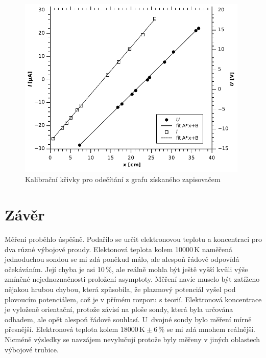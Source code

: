 \documentclass[12pt]{article}
\begin{document}
\begin{figure}[htbp]
\begin{center}
\includegraphics[width=11cm]{prevod.pdf}
\caption{Kalibrační křivky pro odečítání z grafu získaného zapisovačem}
\label{prevod}
\end{center}
\end{figure}

\section{Závěr}
Měření proběhlo úspěšně. Podařilo se určit elektronovou teplotu a koncentraci pro dva různé výbojové proudy. Elektonová teplota kolem 10000\,K naměřená jednoduchou sondou se mi zdá poněkud málo, ale alespoň řádově odpovídá očekáváním. Její chyba je asi 10\,\%, ale reálně mohla být ještě vyšší kvůli výše zmíněné nejednoznačnosti proložení asymptoty. Měření navíc muselo být zatíženo nějakou hrubou chybou, která způsobila, že plazmový potenciál vyšel pod plovoucím potenciálem, což je v přímém rozporu s teorií. Elektronová koncentrace je vyloženě orientační, protože závisí na ploše sondy, která byla určována odhadem, ale opět alespoň řádově souhlasí. U~dvojné sondy bylo měření mírně přesnější. Elektronová teplota kolem $18000\,\mathrm{K} \pm6\,\%$ se mi zdá mnohem reálnější. Nicméně výsledky se navzájem nevylučují protože byly měřeny v jiných oblastech výbojové trubice. 
\end{document}
